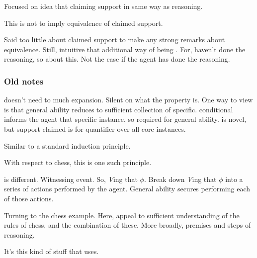 \begin{note}
  Focused on idea that claiming support in same way as reasoning.

  This is not to imply equivalence of claimed support.

  Said too little about claimed support to make any strong remarks about equivalence.
  Still, intuitive that additional way of being \mom{}.
  For, haven't done the reasoning, so \mom{} about this.
  Not the case if the agent has done the reasoning.
\end{note}

\subsubsection{Old notes}

\begin{note}
  \AR{} doesn't need to much expansion.
  Silent on what the property is.
  One way to view is that general ability reduces to sufficient collection of specific.
  \gsi{} conditional informs the agent that specific instance, so required for general ability.
  \gsi{} is novel, but support claimed is for quantifier over all core instances.

  Similar to a standard induction principle.

  With respect to chess, this is one such principle.
\end{note}

\begin{note}
  \WR{} is different.
  Witnessing event.
  So, \emph{V}ing that \(\phi\).
  Break down \emph{V}ing that \(\phi\) into a series of actions performed by the agent.
  General ability secures performing each of those actions.

  Turning to the chess example.
  Here, appeal to sufficient understanding of the rules of chess, and the combination of these.
  More broadly, premises and steps of reasoning.

  It's this kind of stuff that \WR{} uses.
\end{note}

